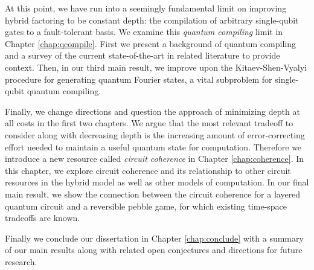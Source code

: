 At this point, we have run into a seemingly fundamental limit on improving
hybrid factoring to be constant depth: the compilation of arbitrary
single-qubit gates to a fault-tolerant basis. We examine this
\emph{quantum compiling} limit in Chapter \ref{chap:qcompile}. First we
present a background of quantum compiling and a survey of the current
state-of-the-art in related literature to provide context. Then, in our
third main result, we improve
upon the Kitaev-Shen-Vyalyi procedure for generating quantum Fourier states,
a vital subproblem for single-qubit quantum compiling.

Finally, we change directions and question the approach of minimizing depth
at all costs in the first two chapters. We argue that the most relevant
tradeoff to consider along with decreasing depth is the increasing amount
of error-correcting effort needed to maintain a useful quantum state for
computation. Therefore we introduce a new resource called
\emph{circuit coherence} in Chapter \ref{chap:coherence}. In this chapter,
we explore circuit coherence and its relationship to other circuit resources
in the hybrid model as well as other models of computation. In our final
main result, we show the connection between the circuit coherence for a
layered quantum circuit and a reversible pebble game, for which existing
time-space tradeoffs are known.

Finally we conclude our dissertation in Chapter \ref{chap:conclude} with a
summary of our main results along with related open conjectures and
directions for future research.







